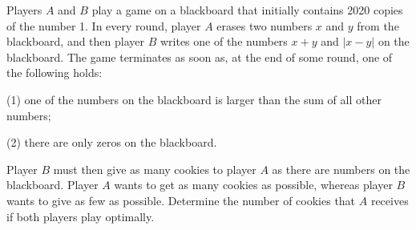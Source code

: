 Players $A$ and $B$ play a game on a blackboard that initially contains 2020 copies of the number 1. In every round, player $A$ erases two numbers $x$ and $y$ from the blackboard, and then player $B$ writes one of the numbers $x+y$ and $|x-y|$ on the blackboard. The game terminates as soon as, at the end of some round, one of the following holds:

(1) one of the numbers on the blackboard is larger than the sum of all other numbers;

(2) there are only zeros on the blackboard.

Player $B$ must then give as many cookies to player $A$ as there are numbers on the blackboard. Player $A$ wants to get as many cookies as possible, whereas player $B$ wants to give as few as possible. Determine the number of cookies that $A$ receives if both players play optimally.
